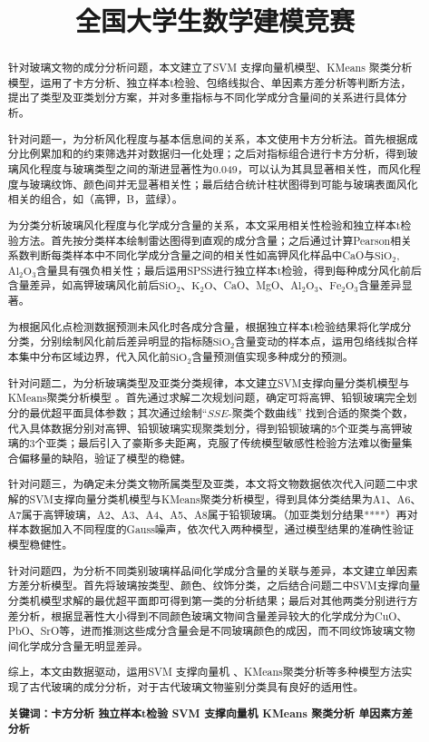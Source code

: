 \documentclass[withoutpreface,bwprint]{cumcmthesis}
\title{全国大学生数学建模竞赛}
\newcommand{\mr}[1]{\mathrm{#1}}
\begin{document}
	
	
\maketitle
\begin{abstract}
   
	
	针对玻璃文物的成分分析问题，本文建立了SVM 支撑向量机模型、KMeans 聚类分析模型，运用了卡方分析、独立样本t检验、包络线拟合、单因素方差分析等判断方法，提出了类型及亚类划分方案，并对多重指标与不同化学成分含量间的关系进行具体分析。
	
	针对问题一，为分析风化程度与基本信息间的关系，本文使用卡方分析法。首先根据成分比例累加和的约束筛选并对数据归一化处理；之后对指标组合进行卡方分析，得到玻璃风化程度与玻璃类型之间的渐进显著性为0.049，可以认为其具显著相关性，而风化程度与玻璃纹饰、颜色间并无显著相关性；最后结合统计柱状图得到可能与玻璃表面风化相关的组合，如（高钾，B，蓝绿）。
	
	为分类分析玻璃风化程度与化学成分含量的关系，本文采用相关性检验和独立样本t检验方法。首先按分类样本绘制雷达图得到直观的成分含量；之后通过计算Pearson相关系数判断每类样本中不同化学成分含量之间的相关性如高钾风化样品中CaO与$\mr{SiO_2}$,$\mr{Al_2O_3}$含量具有强负相关性；最后运用SPSS进行独立样本t检验，得到每种成分风化前后含量差异，如高钾玻璃风化前后$\mr{SiO_2}$、$\mr{K_2O}$、CaO、MgO、$\mr{Al_2O_3}$、$\mr{Fe_2O_3}$含量差异显著。
											  
	 为根据风化点检测数据预测未风化时各成分含量，根据独立样本t检验结果将化学成分分类，分别绘制风化前后差异明显的指标随$\mr{SiO_2}$含量变动的样本点，运用包络线拟合样本集中分布区域边界，代入风化前$\mr{SiO_2}$含量预测值实现多种成分的预测。      
	 
	 针对问题二，为分析玻璃类型及亚类分类规律，本文建立SVM支撑向量分类机模型与KMeans聚类分析模型 。首先通过求解二次规划问题，确定可将高钾、铅钡玻璃完全划分的最优超平面具体参数；其次通过绘制“$SSE$-聚类个数曲线” 找到合适的聚类个数，代入具体数据分别对高钾、铅钡玻璃实现聚类划分，得到铅钡玻璃的5个亚类与高钾玻璃的3个亚类；最后引入了豪斯多夫距离，克服了传统模型敏感性检验方法难以衡量集合偏移量的缺陷，验证了模型的稳健。
	 
	 针对问题三，为确定未分类文物所属类型及亚类，本文将文物数据依次代入问题二中求解的SVM支撑向量分类机模型与KMeans聚类分析模型，得到具体分类结果为A1、A6、A7属于高钾玻璃，A2、A3、A4、A5、A8属于铅钡玻璃。（加亚类划分结果****）再对样本数据加入不同程度的Gauss噪声，依次代入两种模型，通过模型结果的准确性验证模型稳健性。
	 
	 针对问题四，为分析不同类别玻璃样品间化学成分含量的关联与差异，本文建立单因素方差分析模型。首先将玻璃按类型、颜色、纹饰分类，之后结合问题二中SVM支撑向量分类机模型求解的最优超平面即可得到第一类的分析结果；最后对其他两类分别进行方差分析，根据显著性大小得到不同颜色玻璃文物间含量差异较大的化学成分为CuO、PbO、SrO等，进而推测这些成分含量会是不同玻璃颜色的成因，而不同纹饰玻璃文物间化学成分含量无明显差异。
	 
	 综上，本文由数据驱动，运用SVM 支撑向量机  、KMeans聚类分析等多种模型方法实现了古代玻璃的成分分析，对于古代玻璃文物鉴别分类具有良好的适用性。
	 
	\textbf{关键词：卡方分析 独立样本t检验 SVM 支撑向量机  KMeans 聚类分析 单因素方差分析}
\end{abstract}
\end{document}

